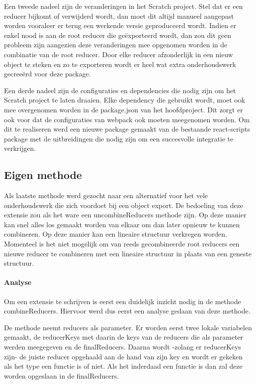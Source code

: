 Een tweede nadeel zijn de veranderingen in het Scratch project. Stel dat er een reducer bijkomt of verwijderd wordt, dan moet dit altijd manueel aangepast worden vooraleer er terug een werkende versie geproduceerd wordt. Indien er enkel nood is aan de root reducer die geëxporteerd wordt, dan zou dit geen probleem zijn aangezien deze veranderingen mee opgenomen worden in de combinatie van de root reducer. Door elke reducer afzonderlijk in een nieuw object te steken en zo te exporteren wordt er heel wat extra onderhoudswerk gecreeërd voor deze package.  

Een derde nadeel zijn de configuraties en dependencies die nodig zijn om het Scratch project te laten draaien. 
Elke dependency die gebruikt wordt, moet ook mee overgenomen worden in de package.json van het hoofdproject. Dit zorgt er ook voor dat de configuraties van webpack ook moeten meegenomen worden. Om dit te realiseren werd een nieuwe package gemaakt van de bestaande react-scripts package met de uitbreidingen die nodig zijn om een succesvolle integratie te verkrijgen.

\subsection{Eigen methode}
Als laatste methode werd gezocht naar een alternatief voor het vele onderhoudswerk die zich voordoet bij een object export. De bedoeling van deze extensie zou als het ware een uncombineReducers methode zijn. Op deze manier kan snel alles los gemaakt worden van elkaar om dan later opnieuw te kunnen combineren. Op deze manier kan een lineaire structuur verkregen worden. Momenteel is het niet mogelijk om van reeds gecombineerde root reducers een nieuwe reducer te combineren met een lineaire structuur in plaats van een geneste structuur. 

\paragraph{Analyse}
Om een extensie te schrijven is eerst een duidelijk inzicht nodig in de methode combineReducers. Hiervoor werd dus eerst een analyse gedaan van deze methode. 

De methode neemt reducers als parameter. Er worden eerst twee lokale variabelen gemaakt, de reducerKeys met daarin de keys van de reducers die als parameter werden meegegeven en de finalReducers. Daarna wordt -zolang er reducerKeys zijn- de juiste reducer opgehaald aan de hand van zijn key en wordt er gekeken als het type een functie is of niet. Als het inderdaad een functie is dan zal deze worden opgeslaan in de finalReducers.

